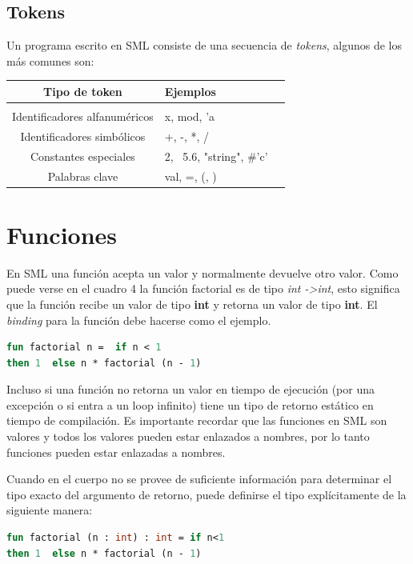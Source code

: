 \documentclass[10pt,journal,compsoc]{IEEEtran}
\begin{document}
\subsection{Tokens}
Un programa escrito en SML consiste de una secuencia de \textit{tokens}, algunos de los m\'as comunes son:
\begin{tabular}{c p{3cm} p{5cm}}
	Tipo de token & Ejemplos\\
	\hline\hline\\
	Identificadores alfanum\'ericos & x, mod, 'a\\
	Identificadores simb\'olicos & +, -, *, /\\
	Constantes especiales & 2, ~5.6, "string", \#'c'\\
	Palabras clave & val, =, (, )\\
	\hline
\end{tabular}

\section{Funciones}
En SML una funci\'on acepta un valor y normalmente devuelve otro valor. Como puede verse en el cuadro 4 la funci\'on factorial es de tipo \textit{int -\textgreater int}, esto significa que la funci\'on recibe un valor de tipo \textbf{int} y retorna un valor de tipo \textbf{int}. El \textit{binding} para la funci\'on debe hacerse como el ejemplo.

\begin{lstlisting}[language=ML, caption=Ejemplo Factorial]
fun factorial n =  if n < 1  
then 1  else n * factorial (n - 1)
\end{lstlisting}

Incluso si una funci\'on no retorna un valor en tiempo de ejecuci\'on (por una excepci\'on o si entra a un loop infinito) tiene un tipo de retorno est\'atico en tiempo de compilaci\'on. Es importante recordar que las funciones en SML son valores y todos los valores pueden estar enlazados a nombres, por lo tanto funciones pueden estar enlazadas a nombres.

Cuando en el cuerpo no se provee de suficiente informaci\'on para determinar el tipo exacto del argumento de retorno, puede definirse el tipo expl\'icitamente de la siguiente manera:

\begin{lstlisting}[language=ML, caption=Ejemplo Factorial Tipo Expl\'icito]
fun factorial (n : int) : int = if n<1
then 1  else n * factorial (n - 1)
\end{lstlisting}
\end{document}
